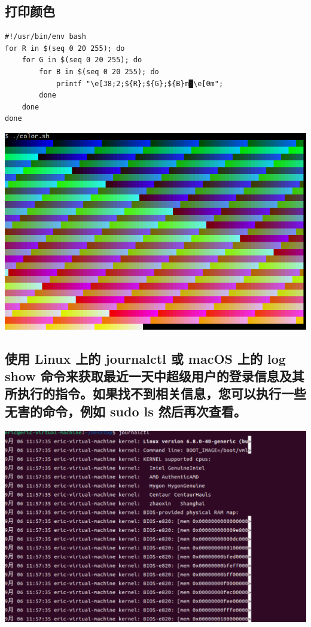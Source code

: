 \documentclass[UTF8,a4paper]{ctexart}
\begin{document}
\subsection{打印颜色}
\begin{lstlisting}
#!/usr/bin/env bash
for R in $(seq 0 20 255); do
    for G in $(seq 0 20 255); do
        for B in $(seq 0 20 255); do
            printf "\e[38;2;${R};${G};${B}m█\e[0m";
        done
    done
done
\end{lstlisting}
\includegraphics[width=1\textwidth]{./pictures/color.png}

\subsection{使用 Linux 上的 journalctl 或 macOS 上的 log show 命令来获取最近一天中超级用户的登录信息及其所执行的指令。如果找不到相关信息，您可以执行一些无害的命令，例如 sudo ls 然后再次查看。}
\begin{table}[H]
\includegraphics[width=1\textwidth]{./pictures/log.png}
\end{table}
\end{document}
